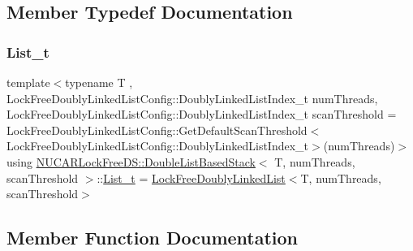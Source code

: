 \subsection{Member Typedef Documentation}
\mbox{\label{class_n_u_c_a_r_lock_free_d_s_1_1_double_list_based_stack_a1ef386e8aaa2b4bb17d44df51f0c9f76}} 
\subsubsection{\texorpdfstring{List\+\_\+t}{List\_t}}
{\footnotesize\ttfamily template$<$typename T , Lock\+Free\+Doubly\+Linked\+List\+Config\+::\+Doubly\+Linked\+List\+Index\+\_\+t num\+Threads, Lock\+Free\+Doubly\+Linked\+List\+Config\+::\+Doubly\+Linked\+List\+Index\+\_\+t scan\+Threshold = Lock\+Free\+Doubly\+Linked\+List\+Config\+::\+Get\+Default\+Scan\+Threshold$<$\+Lock\+Free\+Doubly\+Linked\+List\+Config\+::\+Doubly\+Linked\+List\+Index\+\_\+t$>$(num\+Threads)$>$ \\
using \mbox{\hyperlink{class_n_u_c_a_r_lock_free_d_s_1_1_double_list_based_stack}{N\+U\+C\+A\+R\+Lock\+Free\+D\+S\+::\+Double\+List\+Based\+Stack}}$<$ T, num\+Threads, scan\+Threshold $>$\+::\mbox{\hyperlink{class_n_u_c_a_r_lock_free_d_s_1_1_double_list_based_stack_a1ef386e8aaa2b4bb17d44df51f0c9f76}{List\+\_\+t}} =  \mbox{\hyperlink{class_n_u_c_a_r_lock_free_d_s_1_1_lock_free_doubly_linked_list}{Lock\+Free\+Doubly\+Linked\+List}}$<$T, num\+Threads, scan\+Threshold$>$\hspace{0.3cm}{\ttfamily [private]}}



\subsection{Member Function Documentation}
\mbox{\label{class_n_u_c_a_r_lock_free_d_s_1_1_double_list_based_stack_a5ff2af6c3939738c9a225107242467c9}} 
